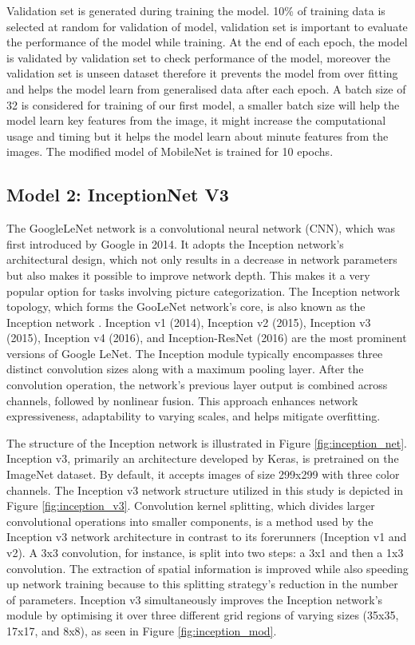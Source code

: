 \documentclass[12pt, a4paper,twoside]{report}
\theoremstyle{plain} %
\theoremstyle{definition} %
\theoremstyle{remark} %
\numberwithin{equation}{chapter}
\begin{document}
Validation set is generated during training the model. 10\% of training data is selected at random for validation of model, validation set is important to evaluate the performance of the model while training. At the end of each epoch, the model is validated by validation set to check performance of the model, moreover the validation set is unseen dataset therefore it prevents the model from over fitting and helps the model learn from generalised data after each epoch. A batch size of 32 is considered for training of our first model, a smaller batch size will help the model learn key features from the image, it might increase the computational usage and timing but it helps the model learn about minute features from the images. The modified model of MobileNet is trained for 10 epochs. 


\subsection{Model 2: InceptionNet V3}\label{sec:3.4.2}
The GoogleLeNet network is a convolutional neural network (CNN), which was first introduced by Google in 2014. It adopts the Inception network's architectural design, which not only results in a decrease in network parameters but also makes it possible to improve network depth. This makes it a very popular option for tasks involving picture categorization. The Inception network topology, which forms the GooLeNet network's core, is also known as the Inception network \cite{abadi2016tensorflow}. Inception v1 (2014), Inception v2 (2015), Inception v3 (2015), Inception v4 (2016), and Inception-ResNet (2016) are the most prominent versions of Google LeNet. The Inception module typically encompasses three distinct convolution sizes along with a maximum pooling layer. After the convolution operation, the network's previous layer output is combined across channels, followed by nonlinear fusion. This approach enhances network expressiveness, adaptability to varying scales, and helps mitigate overfitting. 

The structure of the Inception network is illustrated in Figure \ref{fig:inception_net}. Inception v3, primarily an architecture developed by Keras, is pretrained on the ImageNet dataset. By default, it accepts images of size 299x299 with three color channels. The Inception v3 network structure utilized in this study is depicted in Figure \ref{fig:inception_v3}. Convolution kernel splitting, which divides larger convolutional operations into smaller components, is a method used by the Inception v3 network architecture in contrast to its forerunners (Inception v1 and v2). A 3x3 convolution, for instance, is split into two steps: a 3x1 and then a 1x3 convolution. The extraction of spatial information is improved while also speeding up network training because to this splitting strategy's reduction in the number of parameters. Inception v3 simultaneously improves the Inception network's module by optimising it over three different grid regions of varying sizes (35x35, 17x17, and 8x8), as seen in Figure \ref{fig:inception_mod}.
\end{document}
